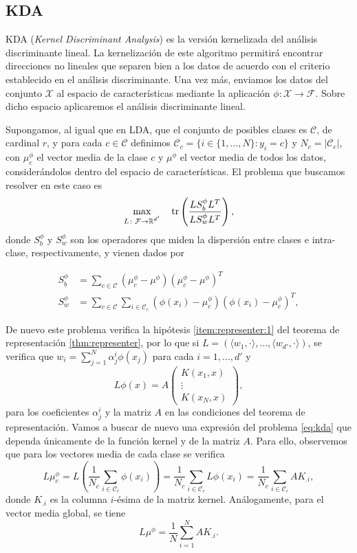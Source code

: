 \subsection{KDA}

KDA (\emph{Kernel Discriminant Analysis}) \cite{kda} es la versión kernelizada del análisis discriminante lineal. La kernelización de este algoritmo permitirá encontrar direcciones no lineales que separen bien a los datos de acuerdo con el criterio establecido en el análisis discriminante. Una vez más, enviamos los datos del conjunto $\mathcal{X}$ al espacio de características mediante la aplicación $\phi \colon \mathcal{X} \to \mathcal{F}$. Sobre dicho espacio aplicaremos el análisis discriminante lineal.

Supongamos, al igual que en LDA, que el conjunto de posibles clases es $\mathcal{C}$, de cardinal $r$, y para cada $c \in \mathcal{C}$ definimos $\mathcal{C}_c = \{i \in \{1,\dots,N\} \colon y_i = c\}$ y $N_c = |\mathcal{C}_c|$, con $\mu_c^{\phi}$ el vector media de la clase $c$ y $\mu^{\phi}$ el vector media de todos los datos, considerándolos dentro del espacio de características. El problema que buscamos resolver en este caso es
\begin{equation} \label{eq:kda}
    \max_{\substack{L \colon \mathcal{F} \to \mathbb{R}^{d'} }} \quad \operatorname{tr}\left(\frac{L S_b^{\phi} L^T}{LS_w^{\phi}L^T}\right),
\end{equation}
donde $S_b^{\phi}$ y $S_w^{\phi}$ son los operadores que miden la dispersión entre clases e intra-clase, respectivamente, y vienen dados por

\begin{align*}
    S_b^{\phi} &= \sum_{c \in \mathcal{C}}(\mu_c^{\phi} - \mu^{\phi})(\mu_c^{\phi} - \mu^{\phi})^T \\
    S_w^{\phi} &= \sum_{c \in \mathcal{C}}\sum_{i \in \mathcal{C}_c}(\phi(x_i)-\mu_c^{\phi})(\phi(x_i)-\mu_c^{\phi})^T,
\end{align*}

De nuevo este problema verifica la hipótesis \ref{item:representer:1} del teorema de representación \ref{thm:representer}, por lo que si $L = (\langle w_1,\cdot\rangle, \dots, \langle w_{d'}, \cdot \rangle)$, se verifica que $w_i = \sum_{j=1}^N \alpha_j^i \phi(x_j)$ para cada $i = 1,\dots,d'$ y
\[L\phi(x) = A \begin{pmatrix} K(x_1,x) \\ \vdots \\ K(x_N,x) \end{pmatrix}, \]
para los coeficientes $\alpha_j^i$ y la matriz $A$ en las condiciones del teorema de representación. Vamos a buscar de nuevo una expresión del problema \ref{eq:kda} que dependa únicamente de la función kernel y de la matriz $A$. Para ello, observemos que para los vectores media de cada clase se verifica
\[ L\mu_c^{\phi} = L\left(\frac{1}{N_c} \sum_{i \in \mathcal{C}_c} \phi(x_i)\right) = \frac{1}{N_c}\sum_{i \in \mathcal{C}_c}L\phi(x_i) = \frac{1}{N_c}\sum_{i \in \mathcal{C}_c}AK_{.i},  \]
donde $K_{.i}$ es la columna $i$-ésima de la matriz kernel. Análogamente, para el vector media global, se tiene
\[ L\mu^{\phi} = \frac{1}{N} \sum_{i=1}^NAK_{.i}. \]

